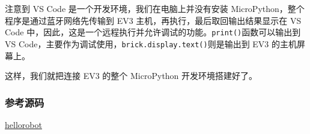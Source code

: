 注意到 VS Code 是一个开发环境，我们在电脑上并没有安装
MicroPython，整个程序是通过蓝牙网络先传输到 EV3
主机，再执行，最后取回输出结果显示在 VS Code
中，因此，这是一个远程执行并允许调试的功能。\texttt{print()}函数可以输出到
VS Code，主要作为调试使用，\texttt{brick.display.text()}则是输出到 EV3
的主机屏幕上。

这样，我们就把连接 EV3 的整个 MicroPython 开发环境搭建好了。

\hypertarget{ux53c2ux8003ux6e90ux7801}{%
\subsubsection{参考源码}\label{ux53c2ux8003ux6e90ux7801}}

\href{https://github.com/michaelliao/learn-python3/tree/master/samples/micropython/hellorobot}{hellorobot}

